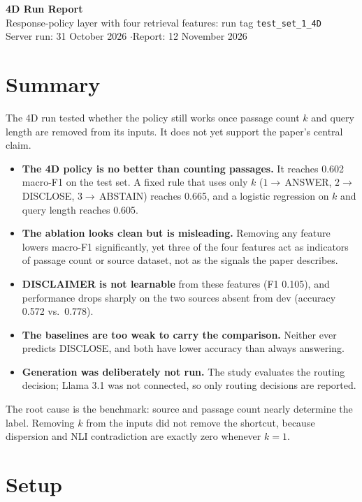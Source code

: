 \documentclass[10pt,a4paper]{article}
\newcommand{\code}[1]{\texttt{\small #1}}
\begin{document}
\begin{center}
{\LARGE\bfseries 4D Run Report}\\[3pt]
{\normalsize Response-policy layer with four retrieval features: run tag \code{test\_set\_1\_4D}}\\[2pt]
{\small Server run: 31 October 2026 \quad$\cdot$\quad Report: 12 November 2026}
\end{center}

\section{Summary}

The 4D run tested whether the policy still works once passage count $k$ and query length are
removed from its inputs. It does not yet support the paper's central claim.

\begin{itemize}
\item \textbf{The 4D policy is no better than counting passages.} It reaches 0.602 macro-F1 on
  the test set. A fixed rule that uses only $k$ ($1\!\to$\,ANSWER, $2\!\to$\,DISCLOSE,
  $3\!\to$\,ABSTAIN) reaches 0.665, and a logistic regression on $k$ and query length reaches 0.605.
\item \textbf{The ablation looks clean but is misleading.} Removing any feature lowers macro-F1
  significantly, yet three of the four features act as indicators of passage count or source
  dataset, not as the signals the paper describes.
\item \textbf{DISCLAIMER is not learnable} from these features (F1 0.105), and performance drops
  sharply on the two sources absent from dev (accuracy 0.572 vs.\ 0.778).
\item \textbf{The baselines are too weak to carry the comparison.} Neither ever predicts DISCLOSE,
  and both have lower accuracy than always answering.
\item \textbf{Generation was deliberately not run.} The study evaluates the routing decision;
  Llama 3.1 was not connected, so only routing decisions are reported.
\end{itemize}

The root cause is the benchmark: source and passage count nearly determine the label. Removing
$k$ from the inputs did not remove the shortcut, because dispersion and NLI contradiction are
exactly zero whenever $k=1$.

\section{Setup}
\end{document}
